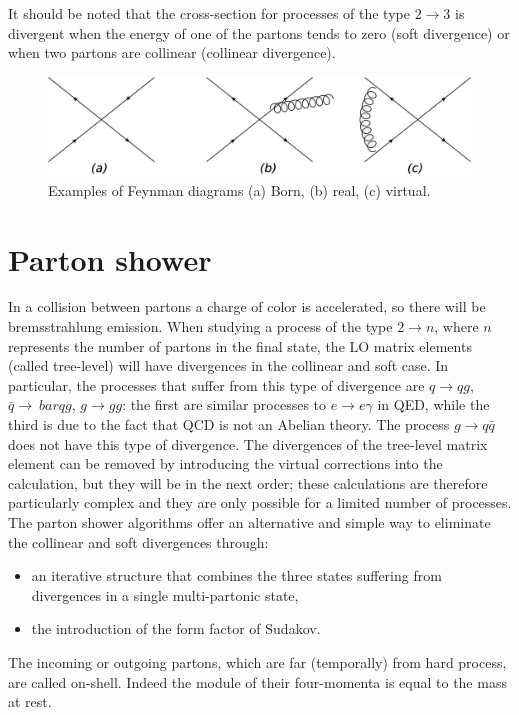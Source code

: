 It should be noted that the cross-section for processes of the type $ 2 \rightarrow 3 $ is divergent when the energy of one of the partons tends to zero (soft divergence) or when two partons are collinear (collinear divergence).
\begin{figure}
\centering
\includegraphics[scale=0.22]{../Cap3/Fig_MC/nlo2}
\caption{ Examples of Feynman diagrams (a)  Born, (b) real, (c) virtual. }
\label{nlofig}
\end{figure}
\section{Parton shower}
\label{ps}
In a collision between partons a charge of color is accelerated, so there will be bremsstrahlung emission. When studying a process of the type $ 2 \rightarrow n $, where $ n $ represents the number of partons in the final state, the LO matrix elements (called tree-level) will have divergences in the collinear  and 
soft case. In particular, the processes that suffer from this type of divergence are $ q \rightarrow qg $, $ \bar{q} \rightarrow \ bar{q} g $, $ g \rightarrow gg $: the first are similar processes to $ e \rightarrow e \gamma $ in QED, while the third is due to the fact that QCD is not an Abelian theory. The process $ g \rightarrow q \bar {q} $ does not have this type of divergence.
The divergences of the tree-level matrix element can be removed by introducing the virtual corrections into the calculation, but they will be in the next order; these calculations are therefore particularly complex and they are only possible for a limited number of processes. The parton shower \cite{Sjostrand: 2006su} algorithms offer an alternative and simple way to eliminate the collinear and soft divergences through:
\begin{itemize}
\item an iterative structure that combines the three states suffering from divergences in a single multi-partonic state,
\item the introduction of the form factor of Sudakov.
\end{itemize}
The incoming or outgoing partons, which are far (temporally) from hard process, are called on-shell. Indeed the module of their four-momenta   is equal to the mass at rest.
